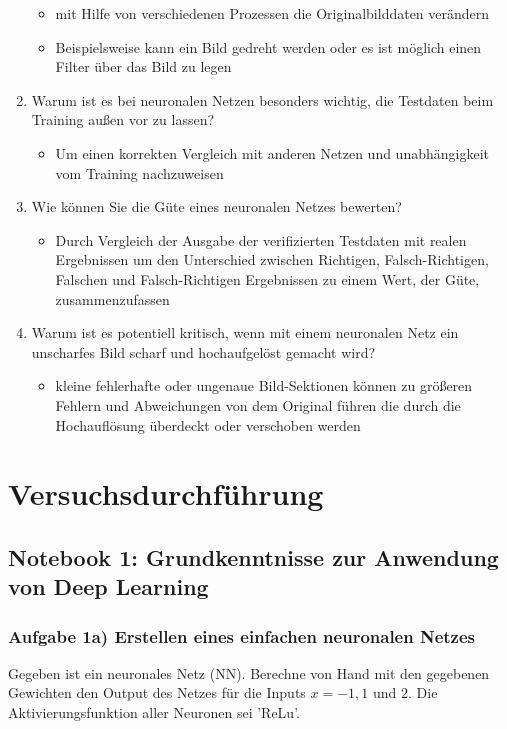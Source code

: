 \documentclass[a4paper,10pt,titlepage]{scrartcl}
\begin{document}
\begin{enumerate}
\begin{itemize}
              \item mit Hilfe von verschiedenen Prozessen die Originalbilddaten verändern
              \item Beispielsweise kann ein Bild gedreht werden oder es ist möglich einen Filter über das Bild zu legen
          \end{itemize}
    \item Warum ist es bei neuronalen Netzen besonders wichtig, die Testdaten beim Training außen vor zu lassen?
          \begin{itemize}
              \item Um einen korrekten Vergleich mit anderen Netzen und unabhängigkeit vom Training nachzuweisen
          \end{itemize}
    \item Wie können Sie die Güte eines neuronalen Netzes bewerten?
          \begin{itemize}
              \item Durch Vergleich der Ausgabe der verifizierten Testdaten mit realen Ergebnissen um den Unterschied zwischen Richtigen, Falsch-Richtigen, Falschen und Falsch-Richtigen Ergebnissen zu einem Wert, der Güte, zusammenzufassen
          \end{itemize}
    \item Warum ist es potentiell kritisch, wenn mit einem neuronalen Netz ein unscharfes Bild scharf und hochaufgelöst gemacht wird?
          \begin{itemize}
              \item kleine fehlerhafte oder ungenaue Bild-Sektionen können zu größeren Fehlern und Abweichungen von dem Original führen die durch die Hochauflösung überdeckt oder verschoben werden
          \end{itemize}
\end{enumerate}
\newpage

\section{Versuchsdurchführung}
\subsection{Notebook 1: Grundkenntnisse zur Anwendung von Deep Learning}
\subsubsection{Aufgabe 1a) Erstellen eines einfachen neuronalen Netzes}
Gegeben ist ein neuronales Netz (NN). Berechne von Hand mit den gegebenen Gewichten den Output des Netzes für die Inputs $x = -1, 1$ und $2$. Die Aktivierungsfunktion aller Neuronen sei 'ReLu'.
\end{document}
